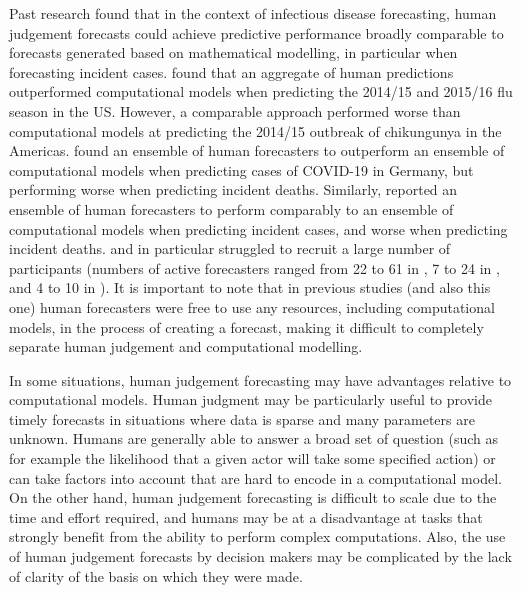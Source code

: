 \documentclass[10pt,a4paper,twocolumn]{article}
\begin{document}
Past research found that in the context of infectious disease forecasting, human judgement forecasts could achieve predictive performance broadly comparable to forecasts generated based on mathematical modelling, in particular when forecasting incident cases. \citet{farrowHumanJudgmentApproach2017} found that an aggregate of human predictions outperformed computational models when predicting the 2014/15 and 2015/16 flu season in the US. However, a comparable approach performed worse than computational models at predicting the 2014/15 outbreak of chikungunya in the Americas. 
\citet{bosseComparingHumanModelbased2022} found an ensemble of human forecasters to outperform an ensemble of computational models when predicting cases of COVID-19 in Germany, but performing worse when predicting incident deaths. Similarly, \citet{mcandrewChimericForecastingCombining2022} reported an ensemble of human forecasters to perform comparably to an ensemble of computational models when predicting incident cases, and worse when predicting incident deaths. \citet{farrowHumanJudgmentApproach2017} and in particular \citet{bosseComparingHumanModelbased2022} struggled to recruit a large number of participants (numbers of active forecasters ranged from 22 to 61 in \citet{mcandrewChimericForecastingCombining2022}, 7 to 24 in \citet{farrowHumanJudgmentApproach2017}, and 4 to 10 in \citet{bosseComparingHumanModelbased2022}). 
It is important to note that in previous studies (and also this one) human forecasters were free to use any resources, including computational models, in the process of creating a forecast, making it difficult to completely separate human judgement and computational modelling. 

In some situations, human judgement forecasting may have advantages relative to computational models. Human judgment may be particularly useful to provide timely forecasts in situations where data is sparse and many parameters are unknown. Humans are generally able to answer a broad set of question (such as for example the likelihood that a given actor will take some specified action) or can take factors into account that are hard to encode in a computational model. On the other hand, human judgement forecasting is difficult to scale due to the time and effort required, and humans may be at a disadvantage at tasks that strongly benefit from the ability to perform complex computations. Also, the use of human judgement forecasts by decision makers may be complicated by the lack of clarity of the basis on which they were made.
\end{document}
